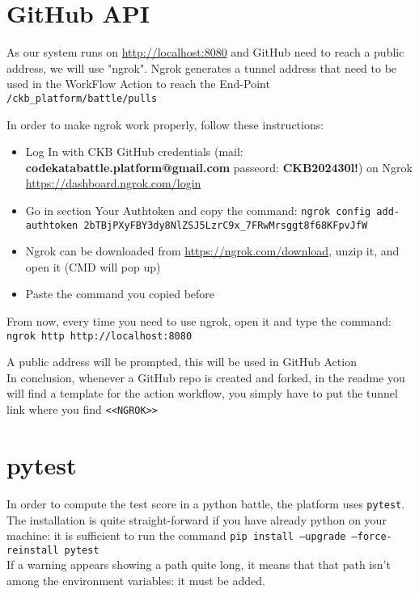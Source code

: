 \section{GitHub API}

As our system runs on  \url{http://localhost:8080} and GitHub need to reach a public address, we will use "ngrok". Ngrok generates a tunnel address that need to be used in the WorkFlow Action to reach the End-Point \texttt{/ckb{\_}platform/battle/pulls}

In order to make ngrok work properly, follow these instructions:
\begin{itemize}
    \item Log In with CKB GitHub credentials (mail: \textbf{codekatabattle.platform@gmail.com} passeord: \textbf{CKB202430l!}) on Ngrok \url{https://dashboard.ngrok.com/login}
    \item Go in section Your Authtoken and copy the command: \texttt{ngrok config add-authtoken 2bTBjPXyFBY3dy8NlZSJ5LzrC9x{\_}7FRwMrsggt8f68KFpvJfW}
    \item Ngrok can be downloaded from \url{https://ngrok.com/download}, unzip it, and open it (CMD will pop up)
    \item Paste the command you copied before
\end{itemize}
From now, every time you need to use ngrok, open it and type the command: \texttt{ngrok http http://localhost:8080}

A public address will be prompted, this will be used in GitHub Action\\

In conclusion, whenever a GitHub repo is created and forked, in the readme you will find a template for the action workflow, you simply have to put the tunnel link where you find \texttt{<<NGROK>>}

\section{pytest}

In order to compute the test score in a python battle, the platform uses \texttt{pytest}.\\

The installation is quite straight-forward if you have already python on your machine: it is sufficient to run the command \texttt{pip install --upgrade --force-reinstall pytest}\\
If a warning appears showing a path quite long, it means that that path isn't among the environment variables: it must be added.

